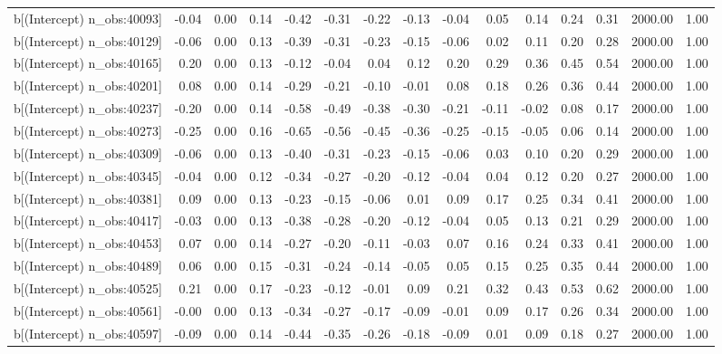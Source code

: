 \begin{table}[ht]
\begin{tabular}{rrrrrrrrrrrrrrr}
  b[(Intercept) n\_obs:40093] & -0.04 & 0.00 & 0.14 & -0.42 & -0.31 & -0.22 & -0.13 & -0.04 & 0.05 & 0.14 & 0.24 & 0.31 & 2000.00 & 1.00 \\ 
  b[(Intercept) n\_obs:40129] & -0.06 & 0.00 & 0.13 & -0.39 & -0.31 & -0.23 & -0.15 & -0.06 & 0.02 & 0.11 & 0.20 & 0.28 & 2000.00 & 1.00 \\ 
  b[(Intercept) n\_obs:40165] & 0.20 & 0.00 & 0.13 & -0.12 & -0.04 & 0.04 & 0.12 & 0.20 & 0.29 & 0.36 & 0.45 & 0.54 & 2000.00 & 1.00 \\ 
  b[(Intercept) n\_obs:40201] & 0.08 & 0.00 & 0.14 & -0.29 & -0.21 & -0.10 & -0.01 & 0.08 & 0.18 & 0.26 & 0.36 & 0.44 & 2000.00 & 1.00 \\ 
  b[(Intercept) n\_obs:40237] & -0.20 & 0.00 & 0.14 & -0.58 & -0.49 & -0.38 & -0.30 & -0.21 & -0.11 & -0.02 & 0.08 & 0.17 & 2000.00 & 1.00 \\ 
  b[(Intercept) n\_obs:40273] & -0.25 & 0.00 & 0.16 & -0.65 & -0.56 & -0.45 & -0.36 & -0.25 & -0.15 & -0.05 & 0.06 & 0.14 & 2000.00 & 1.00 \\ 
  b[(Intercept) n\_obs:40309] & -0.06 & 0.00 & 0.13 & -0.40 & -0.31 & -0.23 & -0.15 & -0.06 & 0.03 & 0.10 & 0.20 & 0.29 & 2000.00 & 1.00 \\ 
  b[(Intercept) n\_obs:40345] & -0.04 & 0.00 & 0.12 & -0.34 & -0.27 & -0.20 & -0.12 & -0.04 & 0.04 & 0.12 & 0.20 & 0.27 & 2000.00 & 1.00 \\ 
  b[(Intercept) n\_obs:40381] & 0.09 & 0.00 & 0.13 & -0.23 & -0.15 & -0.06 & 0.01 & 0.09 & 0.17 & 0.25 & 0.34 & 0.41 & 2000.00 & 1.00 \\ 
  b[(Intercept) n\_obs:40417] & -0.03 & 0.00 & 0.13 & -0.38 & -0.28 & -0.20 & -0.12 & -0.04 & 0.05 & 0.13 & 0.21 & 0.29 & 2000.00 & 1.00 \\ 
  b[(Intercept) n\_obs:40453] & 0.07 & 0.00 & 0.14 & -0.27 & -0.20 & -0.11 & -0.03 & 0.07 & 0.16 & 0.24 & 0.33 & 0.41 & 2000.00 & 1.00 \\ 
  b[(Intercept) n\_obs:40489] & 0.06 & 0.00 & 0.15 & -0.31 & -0.24 & -0.14 & -0.05 & 0.05 & 0.15 & 0.25 & 0.35 & 0.44 & 2000.00 & 1.00 \\ 
  b[(Intercept) n\_obs:40525] & 0.21 & 0.00 & 0.17 & -0.23 & -0.12 & -0.01 & 0.09 & 0.21 & 0.32 & 0.43 & 0.53 & 0.62 & 2000.00 & 1.00 \\ 
  b[(Intercept) n\_obs:40561] & -0.00 & 0.00 & 0.13 & -0.34 & -0.27 & -0.17 & -0.09 & -0.01 & 0.09 & 0.17 & 0.26 & 0.34 & 2000.00 & 1.00 \\ 
  b[(Intercept) n\_obs:40597] & -0.09 & 0.00 & 0.14 & -0.44 & -0.35 & -0.26 & -0.18 & -0.09 & 0.01 & 0.09 & 0.18 & 0.27 & 2000.00 & 1.00 \\ 

\end{tabular}
\end{table}
